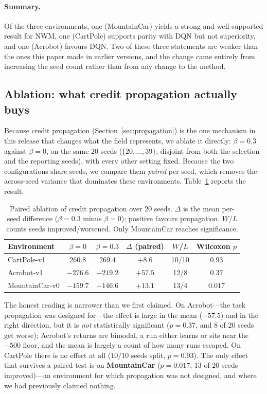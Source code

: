 \documentclass[11pt]{article}
\newcommand{\NWM}{\textsc{NWM}}
\begin{document}
\paragraph{Summary.} Of the three environments, one (MountainCar) yields a
strong and well-supported result for \NWM{}, one (CartPole) supports parity with
DQN but not superiority, and one (Acrobot) favours DQN. Two of these three
statements are weaker than the ones this paper made in earlier versions, and the
change came entirely from increasing the seed count rather than from any change
to the method.

\subsection{Ablation: what credit propagation actually buys}
\label{sec:ablation}

Because credit propagation (Section~\ref{sec:propagation}) is the one mechanism
in this release that changes what the field represents, we ablate it directly:
$\beta{=}0.3$ against $\beta{=}0$, on the same $20$ seeds
($\{20,\dots,39\}$, disjoint from both the selection and the reporting seeds),
with every other setting fixed. Because the two configurations share seeds, we
compare them \emph{paired} per seed, which removes the across-seed variance that
dominates these environments. Table~\ref{tab:ablation} reports the result.

\begin{table}[t]
\centering
\caption{Paired ablation of credit propagation over $20$ seeds. $\Delta$ is the
mean per-seed difference ($\beta{=}0.3$ minus $\beta{=}0$); positive favours
propagation. $W$/$L$ counts seeds improved/worsened. Only MountainCar reaches
significance.}
\label{tab:ablation}
\small
\begin{tabular}{lccccc}
\toprule
Environment & $\beta{=}0$ & $\beta{=}0.3$ & $\Delta$ (paired) & $W$/$L$ & Wilcoxon $p$ \\
\midrule
CartPole-v1    & $260.8$  & $269.4$  & $+8.6$  & 10/10 & $0.93$ \\
Acrobot-v1     & $-276.6$ & $-219.2$ & $+57.5$ & 12/8  & $0.37$ \\
MountainCar-v0 & $-159.7$ & $-146.6$ & $+13.1$ & 13/4  & $\mathbf{0.017}$ \\
\bottomrule
\end{tabular}
\end{table}

The honest reading is narrower than we first claimed. On Acrobot---the task
propagation was designed for---the effect is large in the mean ($+57.5$) and in
the right direction, but it is \emph{not} statistically significant
($p=0.37$, and $8$ of $20$ seeds get worse); Acrobot's returns are bimodal, a
run either learns or sits near the $-500$ floor, and the mean is largely a count
of how many runs escaped. On CartPole there is no effect at all
($10/10$ seeds split, $p=0.93$). The only effect that survives a paired test is
on \textbf{MountainCar} ($p=0.017$, $13$ of $20$ seeds improved)---an
environment for which propagation was not designed, and where we had previously
claimed nothing.
\end{document}
